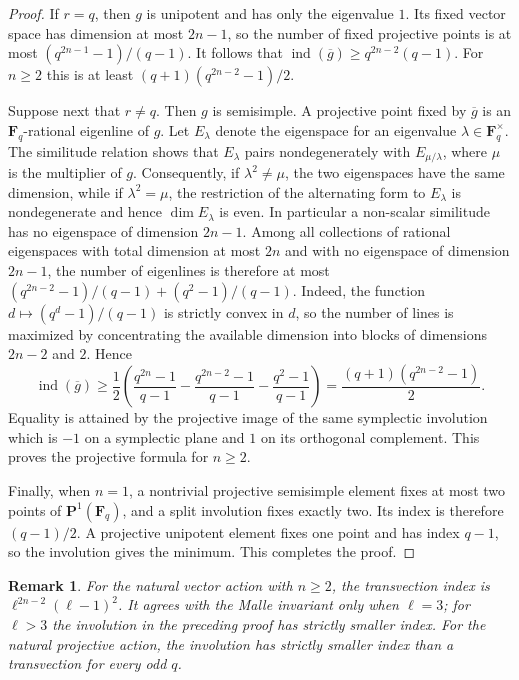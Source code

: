 \documentclass[11pt,hidelinks]{amsart}
\newtheorem{remark}[theorem]{Remark}
\newcommand{\F}{\mathbf F}
\newcommand{\ind}{\operatorname{ind}}
\newcommand{\PP}{\mathbf P}
\begin{document}
\begin{proof}
If $r=q$, then $g$ is unipotent and has only the eigenvalue $1$.  Its
fixed vector space has dimension at most $2n-1$, so the number of fixed projective points is at most $(q^{2n-1}-1)/(q-1)$. It follows that $\ind(\overline g)\geq q^{2n-2}(q-1)$.
For $n\geq2$ this is at least
$(q+1)(q^{2n-2}-1)/2$.

Suppose next that $r\neq q$.  Then $g$ is semisimple.  A projective
point fixed by $\overline g$ is an $\F_q$-rational eigenline of $g$.
Let $E_\lambda$ denote the eigenspace for an eigenvalue
$\lambda\in\F_q^\times$.  The similitude relation shows that
$E_\lambda$ pairs nondegenerately with $E_{\mu/\lambda}$, where
$\mu$ is the multiplier of $g$.  Consequently, if
$\lambda^2\neq\mu$, the two eigenspaces have the same dimension, while
if $\lambda^2=\mu$, the restriction of the alternating form to
$E_\lambda$ is nondegenerate and hence $\dim E_\lambda$ is even.  In
particular a non-scalar similitude has no eigenspace of dimension
$2n-1$.  Among all collections of rational eigenspaces with total
dimension at most $2n$ and with no eigenspace of dimension $2n-1$, the
number of eigenlines is therefore at most $(q^{2n-2}-1)/(q-1)+(q^2-1)/(q-1)$.
Indeed, the function $d\mapsto(q^d-1)/(q-1)$ is strictly convex in
$d$, so the number of lines is maximized by concentrating the available
dimension into blocks of dimensions $2n-2$ and $2$.  Hence
\[
 \ind(\overline g)
 \geq
 \frac12\left(
 \frac{q^{2n}-1}{q-1}
 -\frac{q^{2n-2}-1}{q-1}
 -\frac{q^2-1}{q-1}\right)
 =\frac{(q+1)(q^{2n-2}-1)}2.
\]
Equality is attained by the projective image of the same symplectic
involution which is $-1$ on a symplectic plane and $1$ on its
orthogonal complement.  This proves the projective formula for
$n\geq2$.

Finally, when $n=1$, a nontrivial projective semisimple element fixes at
most two points of $\PP^1(\F_q)$, and a split involution fixes exactly
two.  Its index is therefore $(q-1)/2$.  A projective unipotent element
fixes one point and has index $q-1$, so the involution gives the
minimum.  This completes the proof.
\end{proof}

\begin{remark}\label{rem:malle-transvection}
For the natural vector action with $n\geq2$, the transvection index is
$\ell^{2n-2}(\ell-1)^2$.  It agrees with the Malle invariant only when
$\ell=3$; for $\ell>3$ the involution in the preceding proof has strictly
smaller index.  For the natural projective action, the involution has
strictly smaller index than a transvection for every odd $q$.
\end{remark}
\end{document}
